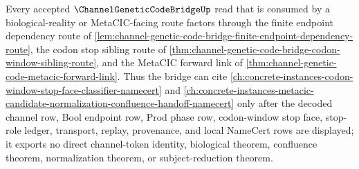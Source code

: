 \begin{lemma}
\label{lem:channel-genetic-code-bridge-bioreality-forward-lattice-route}
Every accepted $\ChannelGeneticCodeBridgeUp$ read that is consumed by a biological-reality or MetaCIC-facing route factors through the finite endpoint dependency route of \autoref{lem:channel-genetic-code-bridge-finite-endpoint-dependency-route}, the codon stop sibling route of \autoref{thm:channel-genetic-code-bridge-codon-window-sibling-route}, and the MetaCIC forward link of \autoref{thm:channel-genetic-code-metacic-forward-link}. Thus the bridge can cite \autoref{ch:concrete-instances-codon-window-stop-face-classifier-namecert} and \autoref{ch:concrete-instances-metacic-candidate-normalization-confluence-handoff-namecert} only after the decoded channel row, Bool endpoint row, Prod phase row, codon-window stop face, stop-role ledger, transport, replay, provenance, and local NameCert rows are displayed; it exports no direct channel-token identity, biological theorem, confluence theorem, normalization theorem, or subject-reduction theorem.
\end{lemma}
